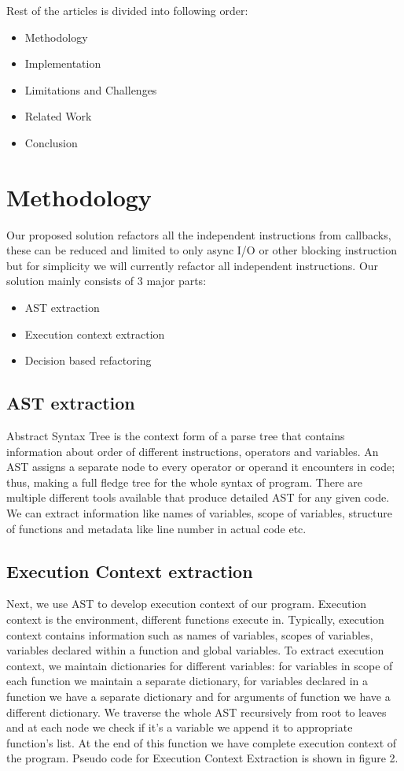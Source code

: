 \documentclass[10pt,conference]{IEEEtran}
\begin{document}
Rest of the articles is divided into following order:
\begin{itemize}
	\item Methodology
	\item Implementation
	\item Limitations and Challenges
	\item Related Work
	\item Conclusion

\end{itemize}

\section{Methodology}
Our proposed solution refactors all the independent instructions from callbacks, these can be reduced and limited to only async I/O or other blocking instruction but for simplicity we will currently refactor all independent instructions. Our solution mainly consists of 3 major parts:
\begin{itemize}
	\item AST extraction
	\item Execution context extraction
	\item Decision based refactoring
\end{itemize}
\subsection{AST extraction}
Abstract Syntax Tree is the context form of a parse tree that contains information about order of different instructions, operators and variables. An AST assigns a separate node to every operator or operand it encounters in code; thus, making a full fledge tree for the whole syntax of program. There are multiple different tools available that produce detailed AST for any given code. We can extract information like names of variables, scope of variables, structure of functions and metadata like line number in actual code etc. 

\subsection{Execution Context extraction}
Next, we use AST to develop execution context of our program. Execution context is the environment, different functions execute in. Typically, execution context contains information such as names of variables, scopes of variables, variables declared within a function and global variables. To extract execution context, we maintain dictionaries for different variables: for variables in scope of each function we maintain a separate dictionary, for variables declared in a function we have a separate dictionary and for arguments of function we have a different dictionary. We traverse the whole AST recursively from root to leaves and at each node we check if it’s a variable we append it to appropriate function’s list. At the end of this function we have complete execution context of the program. Pseudo code for Execution Context Extraction is shown in figure 2.
\end{document}
